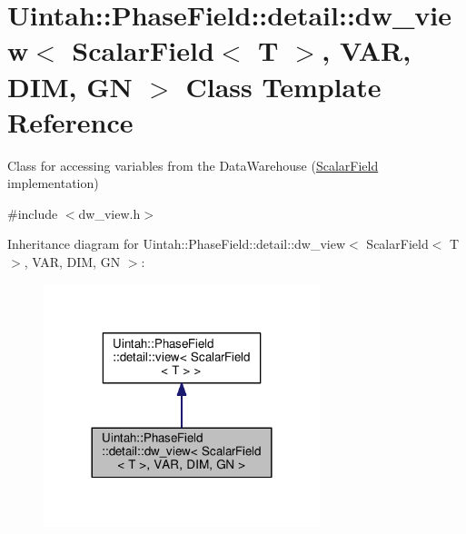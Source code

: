 \hypertarget{classUintah_1_1PhaseField_1_1detail_1_1dw__view_3_01ScalarField_3_01T_01_4_00_01VAR_00_01DIM_00_01GN_01_4}{}\section{Uintah\+:\+:Phase\+Field\+:\+:detail\+:\+:dw\+\_\+view$<$ Scalar\+Field$<$ T $>$, V\+AR, D\+IM, GN $>$ Class Template Reference}
\label{classUintah_1_1PhaseField_1_1detail_1_1dw__view_3_01ScalarField_3_01T_01_4_00_01VAR_00_01DIM_00_01GN_01_4}


Class for accessing variables from the Data\+Warehouse (\hyperlink{structUintah_1_1PhaseField_1_1ScalarField}{Scalar\+Field} implementation)  




{\ttfamily \#include $<$dw\+\_\+view.\+h$>$}



Inheritance diagram for Uintah\+:\+:Phase\+Field\+:\+:detail\+:\+:dw\+\_\+view$<$ Scalar\+Field$<$ T $>$, V\+AR, D\+IM, GN $>$\+:\nopagebreak
\begin{figure}[H]
\begin{center}
\leavevmode
\includegraphics[width=228pt]{classUintah_1_1PhaseField_1_1detail_1_1dw__view_3_01ScalarField_3_01T_01_4_00_01VAR_00_01DIM_00_01GN_01_4__inherit__graph}
\end{center}
\end{figure}


